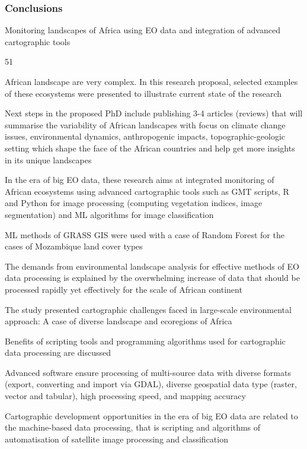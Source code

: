 \documentclass[pdflatex,compress,8pt,
	xcolor={dvipsnames,dvipsnames,svgnames,x11names,table},
	hyperref={colorlinks = true, breaklinks = true, urlcolor = NavyBlue, linkcolor=white, breaklinks = true}]{beamer}
\begin{document}
\begin{frame}\frametitle{Conclusions}

\begin{alertblock}{Monitoring landscapes of Africa using EO data and integration of advanced cartographic tools}
\begin{dinglist}{51}\footnotesize
       \item African landscape are very complex. In this research proposal, selected examples of these ecosystems were presented to illustrate current state of the research
     \item Next steps in the proposed PhD include publishing 3-4 articles (reviews) that will summarise the variability of African landscapes with focus on climate change issues, environmental dynamics, anthropogenic impacts, topographic-geologic setting which shape the face of the African countries and help get more insights in its unique landscapes
     \item In the era of big EO data, these research aims at integrated monitoring of African ecosystems using advanced cartographic tools such as GMT scripts, R and Python for image processing (computing vegetation indices, image segmentation) and ML algorithms for image classification
     \item ML methods of GRASS GIS were used with a case of Random Forest for the cases of Mozambique land cover types
     \item The demands from environmental landscape analysis for effective methods of EO data processing is explained by the overwhelming increase of data that should be processed rapidly yet effectively for the scale of African continent
     \item The study presented cartographic challenges faced in large-scale environmental approach: A case of diverse landscape and ecoregions of Africa
     \item Benefits of scripting tools and programming algorithms used for cartographic data processing are discussed
     \item Advanced software ensure processing of multi-source data with diverse formats (export, converting and import via GDAL), diverse geospatial data type (raster, vector and tabular), high processing speed, and mapping accuracy
     \item Cartographic development opportunities in the era of big EO data are related to the machine-based data processing, that is scripting and algorithms of automatisation of satellite image processing and classification

\end{dinglist}
\end{alertblock}
\end{frame}
\end{document}
